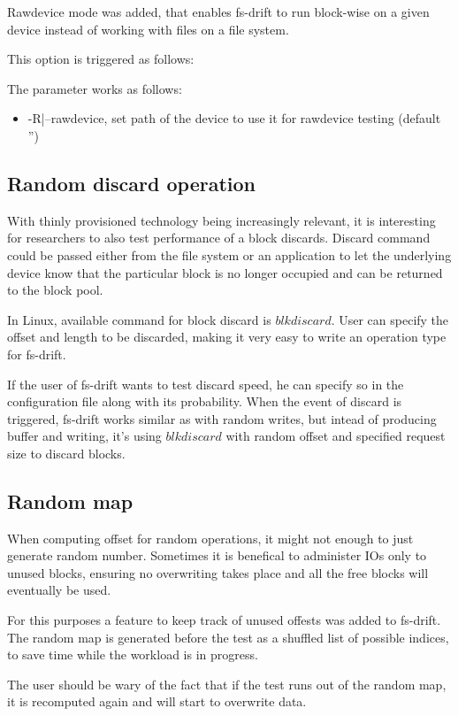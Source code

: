 \documentclass[
  color, %
  table, %
  lof,   %
  lot,   %
]{fithesis3}
\begin{document}
Rawdevice mode was added, that enables fs-drift to run block-wise on a given device instead of working with files on a file system.

This option is triggered as follows:

The parameter works as follows:
\begin{itemize}
    \item -R|--rawdevice, set path of the device to use it for rawdevice testing (default '')
\end{itemize}


\subsection{Random discard operation}
With thinly provisioned technology being increasingly relevant, it is interesting for researchers to also test performance of a block discards. Discard command could be passed either from the file system or an application to let the underlying device know that the particular block is no longer occupied and can be returned to the block pool.

In Linux, available command for block discard is $blkdiscard$. User can specify the offset and length to be discarded, making it very easy to write an operation type for fs-drift.

If the user of fs-drift wants to test discard speed, he can specify so in the configuration file along with its probability. When the event of discard is triggered, fs-drift works similar as with random writes, but intead of producing buffer and writing, it's using $blkdiscard$ with random offset and specified request size to discard blocks.

\subsection{Random map}
When computing offset for random operations, it might not enough to just generate random number. Sometimes it is benefical to administer IOs only to unused blocks, ensuring no overwriting takes place and all the free blocks will eventually be used.

For this purposes a feature to keep track of unused offests was added to fs-drift. The random map is generated before the test as a shuffled list of possible indices, to save time while the workload is in progress.

The user should be wary of the fact that if the test runs out of the random map, it is recomputed again and will start to overwrite data.
\end{document}
